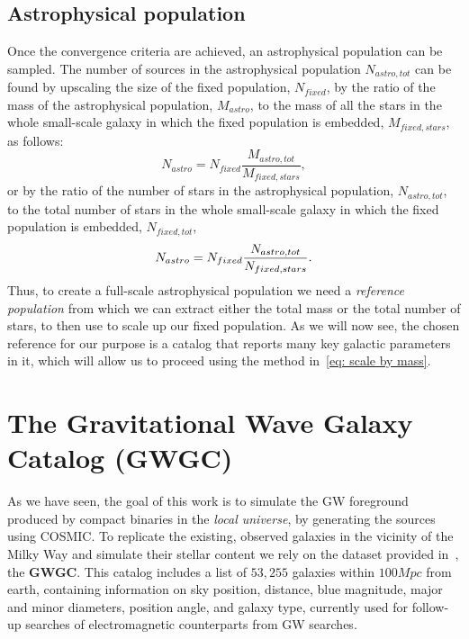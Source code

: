 \subsection{Astrophysical population}
Once the convergence criteria are achieved, an astrophysical population can be sampled. 
The number of sources in the astrophysical population $N_{astro, tot}$ can be found by upscaling the size of the fixed population, $N_{fixed}$, by the ratio of the mass of the astrophysical population, $M_{astro}$, to the mass of all the stars in the whole small-scale galaxy in which the fixed population is embedded, $M_{fixed,stars}$, as follows:
\begin{equation}
    N_{astro} = N_{fixed}\frac{M_{astro, tot}}{M_{fixed, stars}},
    \label{eq: scale by mass}
\end{equation}
or by the ratio of the number of stars in the astrophysical
population, $N_{astro, tot}$, to the total number of stars in the whole small-scale galaxy in which the fixed population is embedded, $N_{fixed,tot}$,
\begin{equation}
    N_{astro} = N_{fixed}\frac{N_{astro, tot}}{N_{fixed, stars}}.
    \notag
\end{equation}
Thus, to create a full-scale astrophysical population we need a \textit{reference population} from which we can extract either the total mass or the total number of stars, to then use to scale up our fixed population.
As we will now see, the chosen reference for our purpose is a catalog that reports many key galactic parameters in it, which will allow us to proceed using the method in~\eqref{eq: scale by mass}.



\section{{The} Gravitational Wave Galaxy Catalog ({GWGC})}
As we have seen, the goal of this work is to simulate the GW foreground produced by compact binaries in the \textit{local universe}, by generating the sources using COSMIC.
To replicate the existing, observed galaxies in the vicinity of the Milky Way and simulate their stellar content we rely on the dataset provided in~\cite{GWGC}, the \textbf{GWGC}.
This catalog includes a list of $53,255$ galaxies within $100Mpc$ from earth, containing information on sky position, distance, blue magnitude, major and minor diameters, position angle, and galaxy type, currently used for follow-up searches of electromagnetic counterparts from GW searches.

